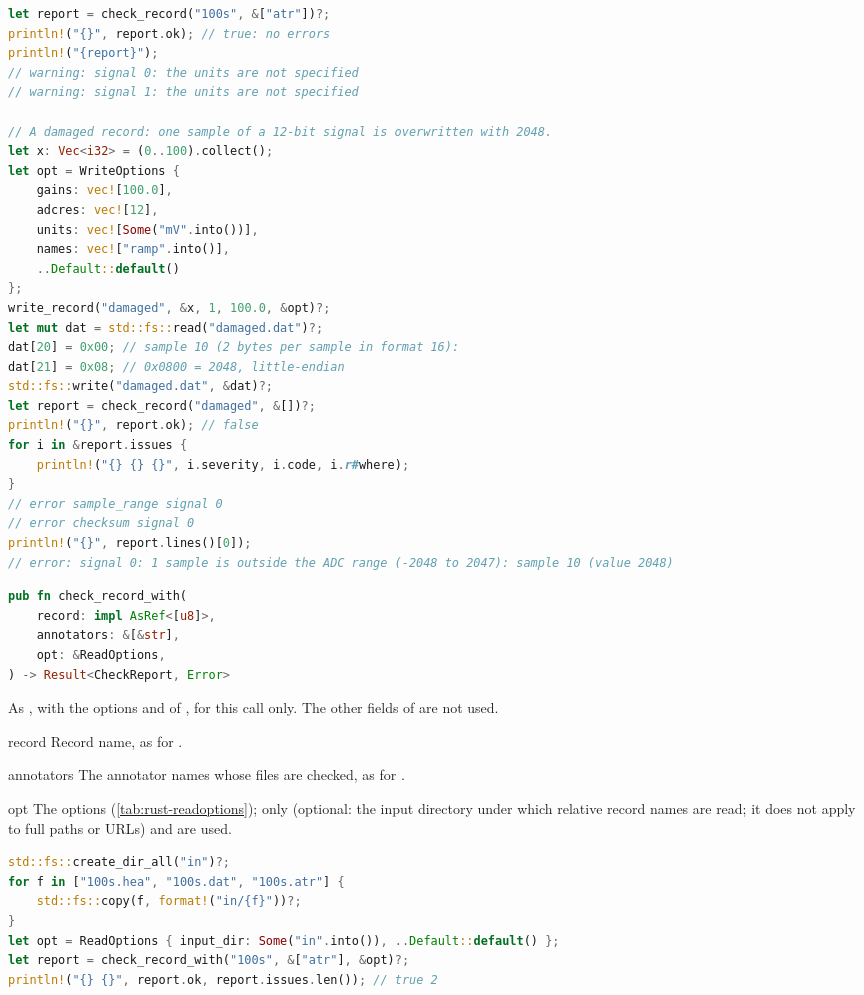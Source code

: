 \begin{lstlisting}[language=Rust,style=example]
let report = check_record("100s", &["atr"])?;
println!("{}", report.ok); // true: no errors
println!("{report}");
// warning: signal 0: the units are not specified
// warning: signal 1: the units are not specified

// A damaged record: one sample of a 12-bit signal is overwritten with 2048.
let x: Vec<i32> = (0..100).collect();
let opt = WriteOptions {
    gains: vec![100.0],
    adcres: vec![12],
    units: vec![Some("mV".into())],
    names: vec!["ramp".into()],
    ..Default::default()
};
write_record("damaged", &x, 1, 100.0, &opt)?;
let mut dat = std::fs::read("damaged.dat")?;
dat[20] = 0x00; // sample 10 (2 bytes per sample in format 16):
dat[21] = 0x08; // 0x0800 = 2048, little-endian
std::fs::write("damaged.dat", &dat)?;
let report = check_record("damaged", &[])?;
println!("{}", report.ok); // false
for i in &report.issues {
    println!("{} {} {}", i.severity, i.code, i.r#where);
}
// error sample_range signal 0
// error checksum signal 0
println!("{}", report.lines()[0]);
// error: signal 0: 1 sample is outside the ADC range (-2048 to 2047): sample 10 (value 2048)
\end{lstlisting}

\begin{lstlisting}[language=Rust,style=signature]
pub fn check_record_with(
    record: impl AsRef<[u8]>,
    annotators: &[&str],
    opt: &ReadOptions,
) -> Result<CheckReport, Error>
\end{lstlisting}
As , with the options  and  of
, for this call only. The other fields of  are not used.
\begin{params}
\item[record] Record name, as for .
\item[annotators] The annotator names whose files are checked, as for
  .
\item[opt] The options (\cref{tab:rust-readoptions}); only  (optional:
  the input directory under which relative record names are read; it does not apply to
  full paths or URLs) and  are used.
\end{params}
\begin{lstlisting}[language=Rust,style=example]
std::fs::create_dir_all("in")?;
for f in ["100s.hea", "100s.dat", "100s.atr"] {
    std::fs::copy(f, format!("in/{f}"))?;
}
let opt = ReadOptions { input_dir: Some("in".into()), ..Default::default() };
let report = check_record_with("100s", &["atr"], &opt)?;
println!("{} {}", report.ok, report.issues.len()); // true 2
\end{lstlisting}

